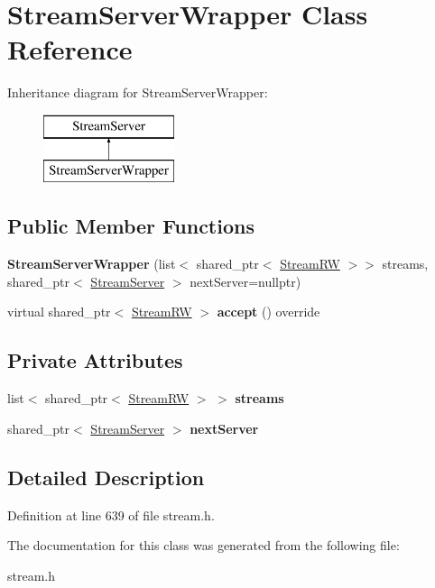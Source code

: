 \hypertarget{classStreamServerWrapper}{\section{Stream\+Server\+Wrapper Class Reference}
\label{classStreamServerWrapper}
}
Inheritance diagram for Stream\+Server\+Wrapper\+:\begin{figure}[H]
\begin{center}
\leavevmode
\includegraphics[height=2.000000cm]{classStreamServerWrapper}
\end{center}
\end{figure}
\subsection*{Public Member Functions}
\begin{DoxyCompactItemize}
\item 
\hypertarget{classStreamServerWrapper_ae602d41dfe21841ab2f25a6b32c75699}{{\bfseries Stream\+Server\+Wrapper} (list$<$ shared\+\_\+ptr$<$ \hyperlink{structStreamRW}{Stream\+R\+W} $>$$>$ streams, shared\+\_\+ptr$<$ \hyperlink{structStreamServer}{Stream\+Server} $>$ next\+Server=nullptr)}\label{classStreamServerWrapper_ae602d41dfe21841ab2f25a6b32c75699}

\item 
\hypertarget{classStreamServerWrapper_a06d09bf58b37635c63e79bb9766eca06}{virtual shared\+\_\+ptr$<$ \hyperlink{structStreamRW}{Stream\+R\+W} $>$ {\bfseries accept} () override}\label{classStreamServerWrapper_a06d09bf58b37635c63e79bb9766eca06}

\end{DoxyCompactItemize}
\subsection*{Private Attributes}
\begin{DoxyCompactItemize}
\item 
\hypertarget{classStreamServerWrapper_a37a8e6c3ceaaeba8d724b5fcb7900f5f}{list$<$ shared\+\_\+ptr$<$ \hyperlink{structStreamRW}{Stream\+R\+W} $>$ $>$ {\bfseries streams}}\label{classStreamServerWrapper_a37a8e6c3ceaaeba8d724b5fcb7900f5f}

\item 
\hypertarget{classStreamServerWrapper_a0184ed2c7b027cca9cc5e9b6ac1acd6b}{shared\+\_\+ptr$<$ \hyperlink{structStreamServer}{Stream\+Server} $>$ {\bfseries next\+Server}}\label{classStreamServerWrapper_a0184ed2c7b027cca9cc5e9b6ac1acd6b}

\end{DoxyCompactItemize}


\subsection{Detailed Description}


Definition at line 639 of file stream.\+h.



The documentation for this class was generated from the following file\+:\begin{DoxyCompactItemize}
\item 
stream.\+h\end{DoxyCompactItemize}

